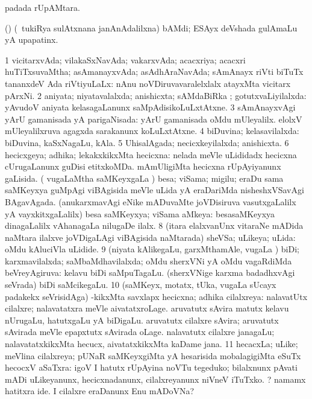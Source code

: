 \bentry
{}
\gl{\nA}
\bmng
{} padada rUpAMtara. 
\emng
\eentry

\bentry
{}
\gl{\nA}
\bmng
(\ca) (\kanmu\ tukiRya sulAtxnana janAnAdalilxna) bAMdi; ESAyx deVshada gulAmaLu yA upapatinx. 
\emng
\eentry

\bentry
{}
\gl{\gu}
\bmng
\bnum
\num{1} vicitarxvAda; vilakaSxNavAda; vakarxvAda; acacxriya; acacxri huTiTxsuvaMtha; asAmanayxvAda; asAdhAraNavAda; sAmAnayx riVti biTuTx tananxdeV Ada riVtiyuLaLx:  nAnu noVDiruvavaralelxlalx atayxMta vicitarx pArxNi. 
\num{2} aniyata; niyatavalalxda; anishicxta; sAMdaBiRka ; gotutxvaLiyilalxda:  yAvudoV aniyata kelasagaLanunx saMpAdisikoLuLxtAtxne. 
\num{3} sAmAnayxvAgi yArU gamanisada yA parigaNisada:  yArU gamanisada oMdu mUleyalilx.  elolxV mUleyalilxruva agagxda sarakanunx koLuLxtAtxne. 
\num{4} biDuvina; kelasavilalxda:  biDuvina, kaSxNagaLu, kAla. 
\num{5} UhisalAgada; necicxkeyilalxda; anishicxta. 
\num{6} hecicxgeya; adhika; lekakxkikxMta hecicxna:  nelada meVle uLididadx hecicxna cUrugaLanunx guDisi etitxkoMDa.  mAmUligiMta hecicxna rUpAyiyanunx gaLisida. 
\banum
{} ( \mo vugaLaMtha saMKeyxgaLa \vi) besa; viSama; migilu; eraDu sama saMKeyxya guMpAgi viBAgisida meVle uLida yA eraDariMda nisheshxVSavAgi BAgavAgada. 
 (anukarxmavAgi eNike mADuvaMte joVDisiruva vasutxgaLalilx yA vayxkitxgaLalilx) besa saMKeyxya; viSama aMkeya:  besasaMKeyxya dinagaLalilx vAhanagaLa nilugaDe ilalx. 
\eanum
\numie
\num{8} (itara elalxvanUnx vitaraNe mADida naMtara ilalxve joVDigaLAgi viBAgisida naMtarada) sheVSa; uLikeya; uLida:  oMdu kAluciVla uLidide. 
\num{9} (niyata kAlikegaLu, garxMthamAle, \mo vugaLa \vi) biDi; karxmavilalxda; saMbaMdhavilalxda; oMdu sherxVNi yA oMdu vagaRdiMda beVreyAgiruva:  kelavu biDi saMpuTagaLu.  (sherxVNige karxma badadhxvAgi seVrada) biDi saMcikegaLu. 
\num{10} (saMKeyx, motatx, tUka, \mo vugaLa sUcayx padakekx seVrisidAga) -kikxMta savxlapx hecicxna; adhika cilalxreya:  nalavatUtx cilalxre; nalavatatxra meVle aivatatxroLage.  aruvatutx sAvira matutx kelavu nUrugaLu, hatutxgaLu yA biDigaLu.  aruvatutx cilalxre sAvira; aruvatutx sAvirada meVle epapxtutx sAvirada oLage.  nalavatutx cilalxre janagaLu; nalavatatxkikxMta hecucx, aivatatxkikxMta kaDame jana. 
\num{11} hecacxLa; uLike; meVlina cilalxreya; pUNaR saMKeyxgiMta yA hesarisida mobalagigiMta eSuTx hecocxV aSaTxra:  igoV I hatutx rUpAyina noVTu tegeduko; bilalxnunx pAvati mADi uLikeyanunx, hecicxnadanunx, cilalxreyanunx niVneV iTuTxko. ? namamx hatitxra  ide. I cilalxre eraDanunx Enu mADoVNa? 
\enum
\emng

